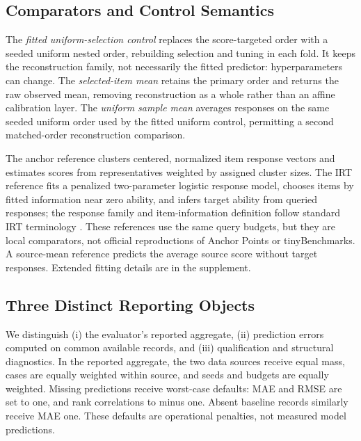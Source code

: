 \documentclass{article}
\begin{document}
\subsection{Comparators and Control Semantics}
The \emph{fitted uniform-selection control} replaces the score-targeted order with a seeded uniform nested order, rebuilding selection and tuning in each fold. It keeps the reconstruction family, not necessarily the fitted predictor: hyperparameters can change. The \emph{selected-item mean} retains the primary order and returns the raw observed mean, removing reconstruction as a whole rather than an affine calibration layer. The \emph{uniform sample mean} averages responses on the same seeded uniform order used by the fitted uniform control, permitting a second matched-order reconstruction comparison.

The anchor reference clusters centered, normalized item response vectors and estimates scores from representatives weighted by assigned cluster sizes. The IRT reference fits a penalized two-parameter logistic response model, chooses items by fitted information near zero ability, and infers target ability from queried responses; the response family and item-information definition follow standard IRT terminology \citep[Chaps.~2,6]{Baker2001}. These references use the same query budgets, but they are local comparators, not official reproductions of Anchor Points or tinyBenchmarks. A source-mean reference predicts the average source score without target responses. Extended fitting details are in the supplement.

\subsection{Three Distinct Reporting Objects}
We distinguish (i) the evaluator's reported aggregate, (ii) prediction errors computed on common available records, and (iii) qualification and structural diagnostics. In the reported aggregate, the two data sources receive equal mass, cases are equally weighted within source, and seeds and budgets are equally weighted. Missing predictions receive worst-case defaults: MAE and RMSE are set to one, and rank correlations to minus one. Absent baseline records similarly receive MAE one. These defaults are operational penalties, not measured model predictions.
\end{document}
